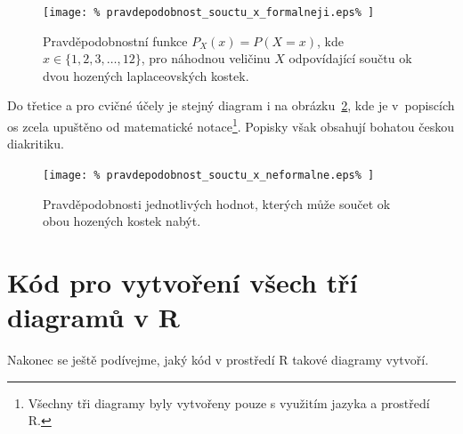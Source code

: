 \documentclass{article}
\begin{document}
\begin{figure}[H]
  \centering
  \texttt{[image: \%
    pravdepodobnost\_souctu\_x\_formalneji.eps\%
  ]}
  \caption{%
    Pravděpodobnostní funkce $P_{X}(x) = P(X = x)$, kde
    \mbox{$x \in \{1, 2, 3, \ldots, 12 \}$}, pro náhodnou veličinu
    $X$ odpovídající součtu ok dvou hozených laplaceovských kostek.
    \label{pravdepodobnost_souctu_x_formalneji}%
  }
\end{figure}

Do třetice a pro cvičné účely je stejný diagram i na
obrázku~\ref{pravdepodobnost_souctu_x_neformalne}, kde je v~popiscích
os zcela upuštěno od matematické notace\footnote{Všechny tři
diagramy byly vytvořeny pouze s využitím jazyka a prostředí \textsf{R}.}.
Popisky však obsahují bohatou českou diakritiku.

\begin{figure}[H]
  \centering
  \texttt{[image: \%
    pravdepodobnost\_souctu\_x\_neformalne.eps\%
  ]}
  \caption{%
    Pravděpodobnosti jednotlivých hodnot, kterých může součet
    ok obou hozených kostek nabýt.
    \label{pravdepodobnost_souctu_x_neformalne}%
  }
\end{figure}

\section{Kód pro vytvoření všech tří diagramů v \textsf{R}}

Nakonec se ještě podívejme, jaký kód v prostředí \textsf{R} takové diagramy
vytvoří.
\end{document}
